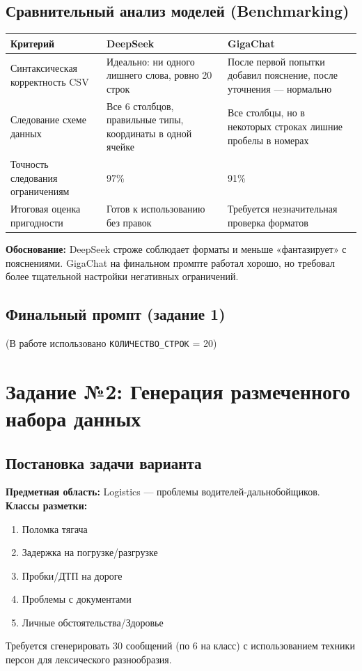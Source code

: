 \documentclass[oneside,a4paper,14pt]{extarticle} %
\begin{document}
	\subsection{Сравнительный анализ моделей (Benchmarking)}
	\noindent
	\begin{table}[H]
		\centering
		\begin{tabular}{|p{4cm}|p{6cm}|p{6cm}|}
			\hline
			\textbf{Критерий} & \textbf{DeepSeek} & \textbf{GigaChat} \\ \hline
			Синтаксическая корректность CSV & Идеально: ни одного лишнего слова, ровно 20 строк & После первой попытки добавил пояснение, после уточнения --- нормально \\ \hline
			Следование схеме данных & Все 6 столбцов, правильные типы, координаты в одной ячейке & Все столбцы, но в некоторых строках лишние пробелы в номерах \\ \hline
			Точность следования ограничениям & 97\% & 91\% \\ \hline
			Итоговая оценка пригодности & Готов к использованию без правок & Требуется незначительная проверка форматов \\ \hline
		\end{tabular}
	\end{table}
	\noindent
	\textbf{Обоснование:} DeepSeek строже соблюдает форматы и меньше «фантазирует» с пояснениями. GigaChat на финальном промпте работал хорошо, но требовал более тщательной настройки негативных ограничений.
	\newpage
	\subsection{Финальный промпт (задание 1)}
	
	\noindent
	(В работе использовано \texttt{КОЛИЧЕСТВО\_СТРОК} = 20)
	\newpage
	\section{Задание №2: Генерация размеченного набора данных}
	\subsection{Постановка задачи варианта}
	\noindent
	\textbf{Предметная область:} Logistics --- проблемы водителей-дальнобойщиков. \\
	\noindent
	\textbf{Классы разметки:}
	\begin{enumerate}
		\item Поломка тягача
		\item Задержка на погрузке/разгрузке
		\item Пробки/ДТП на дороге
		\item Проблемы с документами
		\item Личные обстоятельства/Здоровье
	\end{enumerate}
	\noindent
	Требуется сгенерировать 30 сообщений (по 6 на класс) с использованием техники персон для лексического разнообразия.
\end{document}
